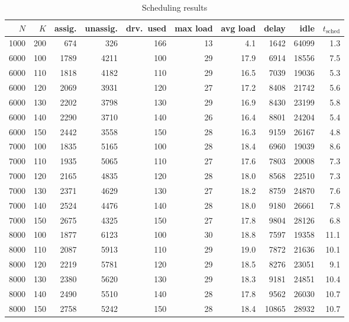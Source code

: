 \begin{table}[H]
\centering
\caption{Scheduling results}
\label{tab:scheduling}
\small
\begin{tabular}{rrrrrrrrrr}
\toprule
$N$ & $K$ & assig. & unassig. & drv.\ used & max load & avg load & delay & idle & $t_{\text{sched}}$ \\
\midrule
1000 & 200 & 674 & 326 & 166 & 13 & 4.1 & 1642 & 64099 & 1.3 \\
6000 & 100 & 1789 & 4211 & 100 & 29 & 17.9 & 6914 & 18556 & 7.5 \\
6000 & 110 & 1818 & 4182 & 110 & 29 & 16.5 & 7039 & 19036 & 5.3 \\
6000 & 120 & 2069 & 3931 & 120 & 27 & 17.2 & 8408 & 21742 & 5.6 \\
6000 & 130 & 2202 & 3798 & 130 & 29 & 16.9 & 8430 & 23199 & 5.8 \\
6000 & 140 & 2290 & 3710 & 140 & 26 & 16.4 & 8801 & 24204 & 5.4 \\
6000 & 150 & 2442 & 3558 & 150 & 28 & 16.3 & 9159 & 26167 & 4.8 \\
7000 & 100 & 1835 & 5165 & 100 & 28 & 18.4 & 6960 & 19039 & 8.6 \\
7000 & 110 & 1935 & 5065 & 110 & 27 & 17.6 & 7803 & 20008 & 7.3 \\
7000 & 120 & 2165 & 4835 & 120 & 28 & 18.0 & 8568 & 22510 & 7.3 \\
7000 & 130 & 2371 & 4629 & 130 & 27 & 18.2 & 8759 & 24870 & 7.6 \\
7000 & 140 & 2524 & 4476 & 140 & 28 & 18.0 & 9180 & 26661 & 7.8 \\
7000 & 150 & 2675 & 4325 & 150 & 27 & 17.8 & 9804 & 28126 & 6.8 \\
8000 & 100 & 1877 & 6123 & 100 & 30 & 18.8 & 7597 & 19358 & 11.1 \\
8000 & 110 & 2087 & 5913 & 110 & 29 & 19.0 & 7872 & 21636 & 10.1 \\
8000 & 120 & 2219 & 5781 & 120 & 29 & 18.5 & 8276 & 23051 & 9.1 \\
8000 & 130 & 2380 & 5620 & 130 & 29 & 18.3 & 9181 & 24851 & 10.4 \\
8000 & 140 & 2490 & 5510 & 140 & 28 & 17.8 & 9562 & 26030 & 10.7 \\
8000 & 150 & 2758 & 5242 & 150 & 28 & 18.4 & 10865 & 28932 & 10.7 \\
\bottomrule
\end{tabular}
\end{table}

